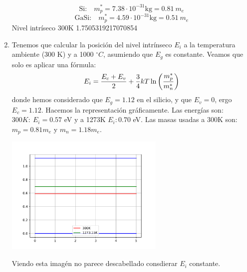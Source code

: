 \begin{texercise}
\begin{enumerate}[label=\alph*)]
		      \begin{equation}
			      \text{Si:} \quad m_p^* = 7.38\cdot10^{-31} \text{kg} = 0.81 \ {m}_e
		      \end{equation}
		      \begin{equation}
			      \text{GaSi:}\quad m_p^* = 4.59 \cdot10^{-31} \text{kg} = 0.51 \ {m}_e
		      \end{equation}
		      Nivel intríseco 300K 1.7505319217070854
		\item Tenemos que calcular la posición del nivel intrínseco $E_i$ a la temperatura ambiente (300 K) y a 1000 $^\circ C$, asumiendo que $E_g$ es constante. Veamos que solo es aplicar una fórmula:
		      \begin{equation}
			      E_i = \frac{E_c+E_v}{2} + \frac{3}{4} kT \ln\left( \frac{m_p^*}{m_n^*} \right)
		      \end{equation}
		      donde hemos considerado que $E_g=1.12$ en el silicio, y que $E_v=0$, ergo $E_c=1.12$. Hacemos la representación gráficamente. Las energías son: $300K: \ E_i=0.57$ eV y a 1273K $E_i: 0.70$ eV. Las masas usadas a 300K son: $m_p=0.81m_e$ y $m_n=1.18m_e$.
		      \begin{center}
			      \includegraphics[width=0.6\textwidth]{Cuerpo/Ch_01/Ejercicio_01_5.pdf}
		      \end{center}
		      Viendo esta imagén no parece descabellado consdierar $E_i$ constante.
	\end{enumerate}
\end{texercise}



